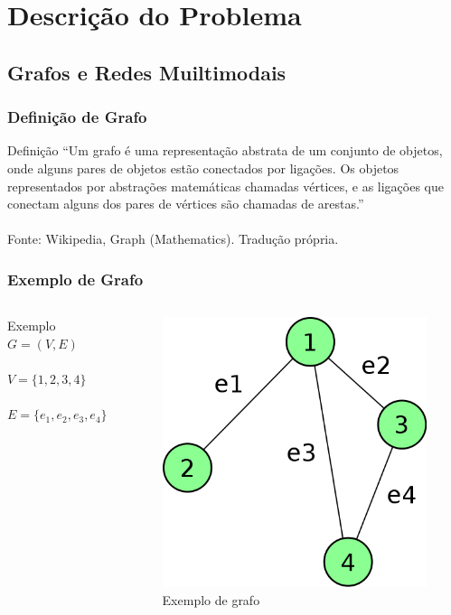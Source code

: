 \section{Descrição do Problema}

\subsection{Grafos e Redes Muiltimodais}

\frame
{
\frametitle{Definição de Grafo}
\begin{block}{Definição}
``Um grafo é uma representação abstrata de um conjunto de objetos, onde alguns pares de objetos estão conectados por ligações.
Os objetos representados por abstrações matemáticas chamadas vértices, e as ligações que conectam alguns dos pares de vértices são chamadas de arestas.''
\\ ~ \\
\tiny
Fonte: Wikipedia, Graph (Mathematics). Tradução própria.
\end{block}
}

\frame
{
\frametitle{Exemplo de Grafo}
\begin{columns}[c]
\column{1.5in}
	\begin{exampleblock}{Exemplo}
		$G = (V,E)$ \\
		$ $ \\
		$V = \{1,2,3,4\}$ \\
		$ $ \\
		$E = \{e_1,e_2,e_3,e_4\}$ 
	\end{exampleblock}
\column{1.5in}
	\begin{figure}
		\includegraphics[width=\textwidth]{./imgs/grafo.png}
		\caption{Exemplo de grafo}
	\end{figure}
\end{columns}
}

